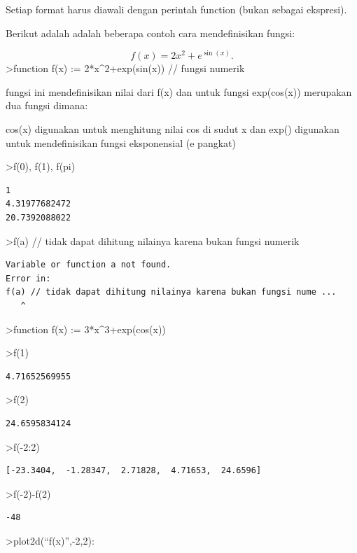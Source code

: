 \documentclass[
]{book}
\begin{document}
Setiap format harus diawali dengan perintah function (bukan sebagai ekspresi).

Berikut adalah adalah beberapa contoh cara mendefinisikan fungsi:

\[f(x)=2x^2+e^{\sin(x)}.\]\textgreater function f(x) := 2*x\^{}2+exp(sin(x)) // fungsi numerik

fungsi ini mendefinisikan nilai dari f(x) dan untuk fungsi exp(cos(x)) merupakan dua fungsi dimana:

cos(x) digunakan untuk menghitung nilai cos di sudut x dan exp() digunakan untuk mendefinisikan fungsi eksponensial (e pangkat)

\textgreater f(0), f(1), f(pi)

\begin{verbatim}
1
4.31977682472
20.7392088022
\end{verbatim}

\textgreater f(a) // tidak dapat dihitung nilainya karena bukan fungsi numerik

\begin{verbatim}
Variable or function a not found.
Error in:
f(a) // tidak dapat dihitung nilainya karena bukan fungsi nume ...
   ^
\end{verbatim}

\textgreater function f(x) := 3*x\^{}3+exp(cos(x))

\textgreater f(1)

\begin{verbatim}
4.71652569955
\end{verbatim}

\textgreater f(2)

\begin{verbatim}
24.6595834124
\end{verbatim}

\textgreater f(-2:2)

\begin{verbatim}
[-23.3404,  -1.28347,  2.71828,  4.71653,  24.6596]
\end{verbatim}

\textgreater f(-2)-f(2)

\begin{verbatim}
-48
\end{verbatim}

\textgreater plot2d(``f(x)'',-2,2):
\end{document}
